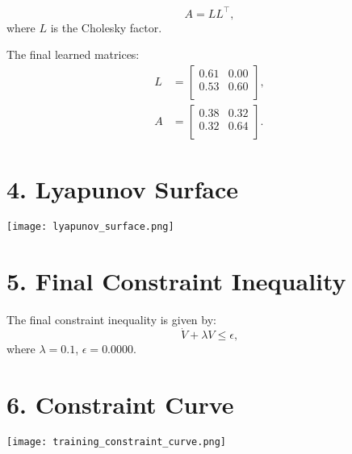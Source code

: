 \documentclass[11pt]{article}
\begin{document}
\begin{equation}
A = L L^\top,
\end{equation}
where $L$ is the Cholesky factor.

The final learned matrices:
\begin{align}
L &= \begin{bmatrix}
0.61 & 0.00 \\
0.53 & 0.60 \\
\end{bmatrix}, \\
A &= \begin{bmatrix}
0.38 & 0.32 \\
0.32 & 0.64 \\
\end{bmatrix}.
\end{align}

\section*{4. Lyapunov Surface}
\texttt{[image: lyapunov\_surface.png]}

\section*{5. Final Constraint Inequality}
The final constraint inequality is given by:
\begin{equation}
\dot{V} + \lambda V \leq \epsilon,
\end{equation}
where $\lambda = 0.1$, $\epsilon = 0.0000$.

\section*{6. Constraint Curve}
\texttt{[image: training\_constraint\_curve.png]}
\end{document}
